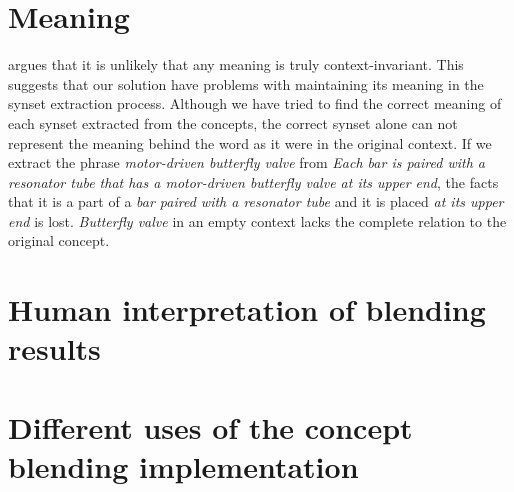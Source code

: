 
\section{Meaning}
\parencite{Reference5} argues that it is unlikely that any meaning is truly context-invariant. This suggests that our solution have problems with maintaining its meaning in the synset extraction process. Although we have tried to find the correct meaning of each synset extracted from the concepts, the correct synset alone can not represent the meaning behind the word as it were in the original context. If we extract the phrase \emph{motor-driven butterfly valve} from \emph{Each bar is paired with a resonator tube that has a motor-driven butterfly valve at its upper end}, the facts that it is a part of a \emph{bar paired with a resonator tube} and it is placed \emph{at its upper end} is lost. \emph{Butterfly valve} in an empty context lacks the complete relation to the original concept.






\section{Human interpretation of blending results}


\section{Different uses of the concept blending implementation}

